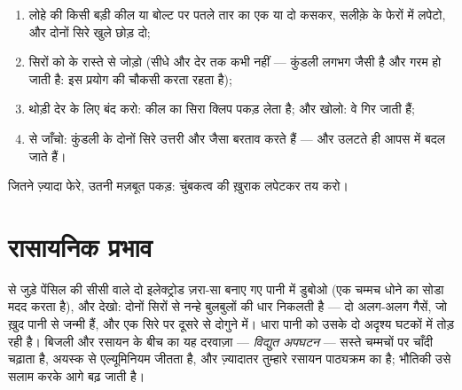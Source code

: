 \begin{method}[विद्युत्चुंबक लपेटना]\label{met:g8:electric-current-effects:wind}
\begin{enumerate}
  \item लोहे की किसी बड़ी कील या बोल्ट पर पतले  तार का एक
        या दो  कसकर, सलीक़े के फेरों में लपेटो, और दोनों सिरे
        खुले छोड़ दो;
  \item सिरों को  के रास्ते  से जोड़ो (सीधे और देर तक कभी
        नहीं --- कुंडली लगभग  जैसी है और गरम हो जाती है:
         इस प्रयोग की चौकसी करता रहता है);
  \item {} थोड़ी देर के लिए बंद करो: कील का सिरा क्लिप पकड़ लेता
        है; और खोलो: वे गिर जाती हैं;
  \item {} से जाँचो: कुंडली के दोनों सिरे उत्तरी और  जैसा बरताव करते हैं --- और  उलटते ही आपस में बदल
        जाते हैं।
\end{enumerate}
जितने ज़्यादा फेरे, उतनी मज़बूत पकड़: चुंबकत्व की ख़ुराक लपेटकर तय
करो।
\end{method}

\section{रासायनिक प्रभाव}

\begin{example}[पानी में से गुज़रती धारा]\label{ex:g8:electric-current-effects:electrolysis}
 से जुड़े पेंसिल की सीसी वाले दो इलेक्ट्रोड ज़रा-सा  बनाए गए
पानी में डुबोओ (एक चम्मच धोने का सोडा मदद करता है), और देखो: दोनों
सिरों से नन्हे बुलबुलों की धार निकलती है --- दो अलग-अलग गैसें, जो ख़ुद
पानी से जन्मी हैं, और एक सिरे पर दूसरे से दोगुने  में। धारा पानी
को उसके दो अदृश्य घटकों में तोड़ रही है। बिजली और रसायन के बीच का यह
दरवाज़ा --- \emph{विद्युत अपघटन} --- सस्ते चम्मचों पर चाँदी चढ़ाता है,
अयस्क से एल्यूमिनियम जीतता है, और ज़्यादातर तुम्हारे रसायन पाठ्यक्रम
का है; भौतिकी उसे सलाम करके आगे बढ़ जाती है।
\end{example}

